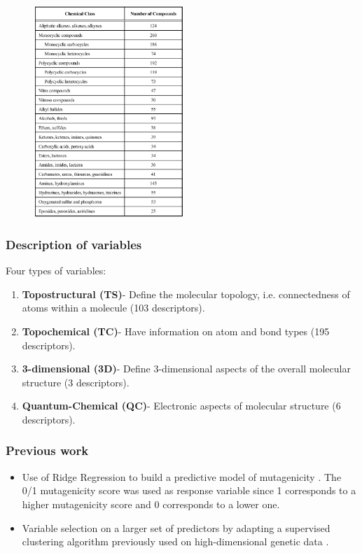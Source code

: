 \documentclass[handout,10pt]{beamer}
\begin{document}
\begin{frame}
\begin{figure}\begin{center}
   \includegraphics[height=8cm]{class.png}
   \label{fig:fig1}
\end{center}\end{figure}
\end{frame}

\begin{frame}
\frametitle{Description of variables}
Four types of variables:\vspace{.5cm}
\begin{enumerate}
\item \textbf{Topostructural (TS)}- Define the molecular topology, i.e. connectedness of atoms within a molecule (103 descriptors).
\vspace{.2cm}
\item \textbf{Topochemical (TC)}- Have information on atom and bond types (195 descriptors).
\vspace{.2cm}
\item \textbf{3-dimensional (3D)}- Define 3-dimensional aspects of the overall molecular structure (3 descriptors).
\vspace{.2cm}
\item \textbf{Quantum-Chemical (QC)}- Electronic aspects of molecular structure (6 descriptors).
\end{enumerate}
\end{frame}

\begin{frame}
\frametitle{Previous work}
\begin{itemize}
\item Use of {\colbbf Ridge Regression} to build a predictive model of mutagenicity \cite{hawk}. The 0/1 mutagenicity score was used as response variable since 1 corresponds to a higher mutagenicity score and 0 corresponds to a lower one.
\vspace{0.5cm}
\item {\colbbf Variable selection} on a larger set of predictors by adapting a supervised clustering algorithm previously used on high-dimensional genetic data \cite{majum}.
\end{itemize}
\end{frame}
\end{document}
